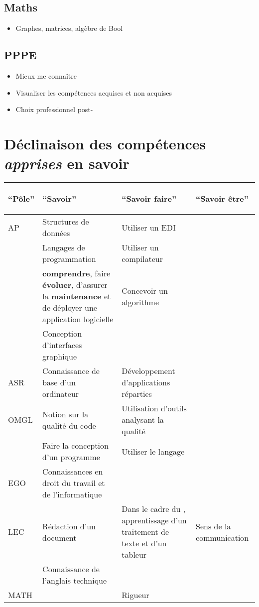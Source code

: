 \documentclass[12pt,a4paper,openany]{article}
\begin{document}
\begin{multicols}{2}
		\subsection{Maths} 
		\begin{itemize}
			\item Graphes, matrices, algèbre de Bool
		\end{itemize}
		\subsection{PPPE}
		\begin{itemize}
			\item Mieux me connaître
			\item Visualiser les compétences acquises et non acquises
			\item Choix professionnel post-
		\end{itemize}
	\end{multicols}
	\section{Déclinaison des compétences \textit{apprises} en savoir}	
	\begin{tabular}{|p{1.2cm}|p{6.0cm}|p{6.0cm}|p{3.4cm}|}
		\hline
		\begin{center}``\textbf{Pôle}'' \end{center}&
		\begin{center}``\textbf{Savoir}'' \end{center}&
		\begin{center}``\textbf{Savoir faire}'' \end{center}& 
		\begin{center}``\textbf{Savoir être}''\end{center} \\
		\hline
		AP & Structures de données & Utiliser un EDI&\\ 
			& Langages de programmation & Utiliser un compilateur &\\
			
			&\textbf{comprendre}, faire \textbf{évoluer}, 
			d’assurer la \textbf{maintenance} et de déployer une application logicielle & Concevoir un algorithme &\\
			& Conception d'interfaces gra\-phique & &\\
		\hline
			ASR& Connaissance de base d'un ordinateur& Développement d'applications réparties & \\
		\hline
			OMGL & Notion sur la qualité du code & Utilisation d'outils analysant la qualité & \\
			& Faire la conception d'un programme & Utiliser le langage \bsc{UML} & \\
		\hline
			EGO &	Connaissances en droit du travail et de l'informatique &&\\
		\hline
		LEC &	Rédaction d'un document & Dans le cadre du \bsc{C2I}, apprentissage d'un traitement de texte
			et d'un tableur & Sens de la communication \\
			 & Connaissance de l'anglais technique & &\\
		\hline
		MATH & & Rigueur&\\
		\hline
	\end{tabular} 
	\newpage
\end{document}
